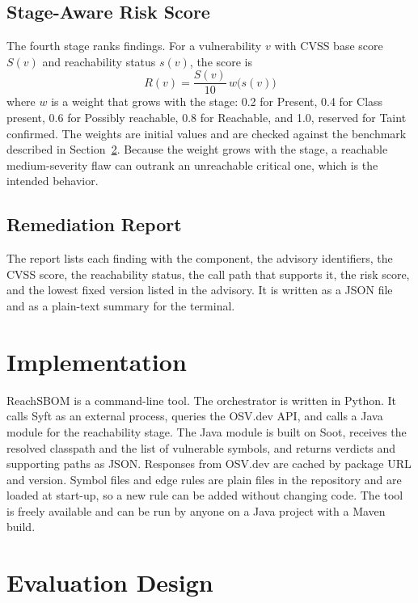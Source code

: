 \documentclass[conference]{IEEEtran}
\begin{document}
\subsection{Stage-Aware Risk Score}
The fourth stage ranks findings. For a vulnerability $v$ with CVSS base score $S(v)$ and reachability status $s(v)$, the score is
\begin{equation}
R(v) = \frac{S(v)}{10}\, w\bigl(s(v)\bigr)
\end{equation}
where $w$ is a weight that grows with the stage: 0.2 for Present, 0.4 for Class present, 0.6 for Possibly reachable, 0.8 for Reachable, and 1.0, reserved for Taint confirmed. The weights are initial values and are checked against the benchmark described in Section~\ref{sec:eval}. Because the weight grows with the stage, a reachable medium-severity flaw can outrank an unreachable critical one, which is the intended behavior.

\subsection{Remediation Report}
The report lists each finding with the component, the advisory identifiers, the CVSS score, the reachability status, the call path that supports it, the risk score, and the lowest fixed version listed in the advisory. It is written as a JSON file and as a plain-text summary for the terminal.

\section{Implementation}\label{sec:impl}
ReachSBOM is a command-line tool. The orchestrator is written in Python. It calls Syft as an external process, queries the OSV.dev API, and calls a Java module for the reachability stage. The Java module is built on Soot, receives the resolved classpath and the list of vulnerable symbols, and returns verdicts and supporting paths as JSON. Responses from OSV.dev are cached by package URL and version. Symbol files and edge rules are plain files in the repository and are loaded at start-up, so a new rule can be added without changing code. The tool is freely available and can be run by anyone on a Java project with a Maven build.

\section{Evaluation Design}\label{sec:eval}
\end{document}
